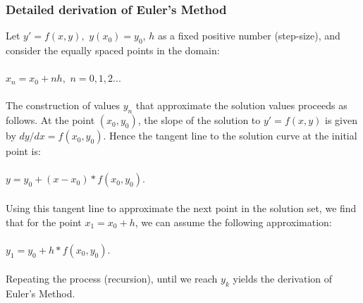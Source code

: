 \documentclass[12pt]{article}
\begin{document}
\subsubsection*{Detailed derivation of Euler's Method}

Let $y' = f(x, y),$   $y(x_0) = y_0$, $h$ as a fixed positive number
(step-size), and consider the equally spaced points in the domain:\\
\\
\hspace*{2ex} $x_n = x_0 + nh,$   $n = 0, 1, 2...$\\
\\
The construction of values $y_n$ that approximate the solution values proceeds as follows.
At the point $(x_0, y_0)$, the slope of the solution to $y' = f(x, y)$ is given by
${dy}/{dx} = f(x_0, y_0)$. Hence the tangent line to the solution curve at the initial point is:\\
\\
\hspace*{2ex} $y = y_0 + (x - x_0)*f(x_0, y_0)$.\\
\\
Using this tangent line to approximate the next point in the solution set, we find that
for the point $x_1 = x_0 + h$, we can assume the following approximation:\\
\\
\hspace*{2ex} $y_1 = y_0 + h*f(x_0, y_0).$\\
\\
Repeating the process (recursion), until we reach $y_k$ yields the derivation of Euler's Method.

~\newline

\end{document}
